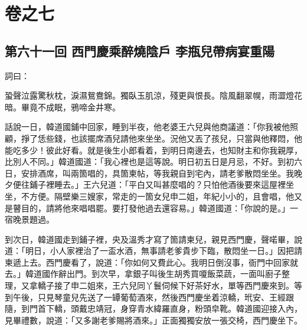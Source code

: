 \part*{{\titlename}卷之七}



\chapter*{第六十一回 西門慶乘醉燒陰戶 李瓶兒帶病宴重陽}


詞曰：

\begin{myquote}
蛩聲泣露驚秋枕，淚濕鴛鴦錦。獨臥玉肌涼，殘更與恨長。陰風翻翠幌，雨澀燈花暗。畢竟不成眠，鴉啼金井寒。

\end{myquote}

話說一日，韓道國鋪中回家，睡到半夜，他老婆王六兒與他商議道：「你我被他照顧，{}掙了恁些錢，也該擺席酒兒請他來坐坐。況他又丟了孩兒，只當與他釋悶，他能吃多少！彼此好看。就是後生小郎看着，{}到明日南邊去，也知財主和你我親厚，比別人不同。」韓道國道：「我心裡也是這等說。明日初五日是月忌，不好。到初六日，安排酒席，叫兩箇唱的，具箇柬帖，等我親自到宅內，請老爹散悶坐坐。我晚夕便往鋪子裡睡去。」{}王六兒道：「平白又叫甚麼唱的？只怕他酒後要來這屋裡坐坐，不方便。隔壁樂三嫂家，常走的一箇女兒申二姐，年紀小小的，且會唱，他又是瞽目的，請將他來唱唱罷。要打發他過去還容易。」韓道國道：「你說的是。」{}一宿晚景題過。

到次日，韓道國走到鋪子裡，央及溫秀才寫了箇請柬兒，親見西門慶，聲喏畢，說道：「明日，小人家裡治了一盃水酒，無事請老爹貴步下臨，散悶坐一日。」因把請柬遞上去。西門慶看了，說道：「你如何又費此心。我明日倒沒事，衙門中回家就去。」韓道國作辭出門。到次早，拿銀子叫後生胡秀買嗄飯菜蔬，一面叫廚子整理，又拿轎子接了申二姐來，王六兒同丫鬟伺候下好茶好水，單等西門慶來到。等到午後，只見琴童兒先送了一罈葡萄酒來，{}然後西門慶坐着涼轎，玳安、王經跟隨，到門首下轎，頭戴忠靖冠，身穿青水緯羅直身，粉頭皁靴。韓道國迎接入內，見畢禮數，說道：「又多謝老爹賜將酒來。」正面獨獨安放一張交椅，西門慶坐下。

